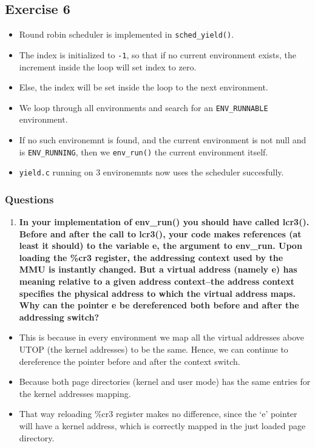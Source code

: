 \documentclass[]{article}
\begin{document}
\subsection{Exercise 6}

\begin{itemize}
\itemsep1pt\parskip0pt
\item
  Round robin scheduler is implemented in \texttt{sched\_yield()}.
\item
  The index is initialized to \texttt{-1}, so that if no current
  environment exists, the increment inside the loop will set index to
  zero.
\item
  Else, the index will be set inside the loop to the next environment.
\item
  We loop through all environments and search for an
  \texttt{ENV\_RUNNABLE} environment.
\item
  If no such environemnt is found, and the current environment is not
  null and is \texttt{ENV\_RUNNING}, then we \texttt{env\_run()} the
  current environment itself.
\item
  \texttt{yield.c} running on 3 environemnts now uses the scheduler
  succesfully.
\end{itemize}

\subsubsection{Questions}

\begin{enumerate}
\def\labelenumi{\arabic{enumi}.}
\setcounter{enumi}{2}
\itemsep1pt\parskip0pt
\item
  \textbf{In your implementation of env\_run() you should have called
  lcr3(). Before and after the call to lcr3(), your code makes
  references (at least it should) to the variable e, the argument to
  env\_run. Upon loading the \%cr3 register, the addressing context used
  by the MMU is instantly changed. But a virtual address (namely e) has
  meaning relative to a given address context--the address context
  specifies the physical address to which the virtual address maps. Why
  can the pointer e be dereferenced both before and after the addressing
  switch?}
\end{enumerate}

\begin{itemize}
\itemsep1pt\parskip0pt
\item
  This is because in every environment we map all the virtual addresses
  above UTOP (the kernel addresses) to be the same. Hence, we can
  continue to dereference the pointer before and after the context
  switch.
\item
  Because both page directories (kernel and user mode) has the same
  entries for the kernel addresses mapping.
\item
  That way reloading \%cr3 register makes no difference, since the `e'
  pointer will have a kernel address, which is correctly mapped in the
  just loaded page directory.
\end{itemize}
\end{document}
